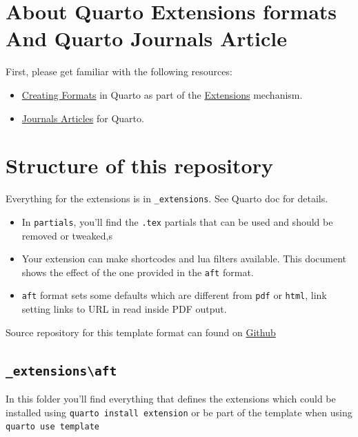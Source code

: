 \documentclass[
  10pt,
]{scrartcl}
\providecommand{\tightlist}{%
  \setlength{\itemsep}{0pt}\setlength{\parskip}{0pt}}\usepackage{longtable,booktabs,array}
\begin{document}
\section{About Quarto Extensions formats And Quarto Journals
Article}\label{about-quarto-extensions-formats-and-quarto-journals-article}

First, please get familiar with the following resources:

\begin{itemize}
\tightlist
\item
  \href{https://quarto.org/docs/extensions/formats.html}{Creating
  Formats} in Quarto as part of the
  \href{https://quarto.org/docs/extensions/}{Extensions} mechanism.
\item
  \href{https://quarto.org/docs/journals/}{Journals Articles} for
  Quarto.
\end{itemize}

\section{Structure of this
repository}\label{structure-of-this-repository}

Everything for the extensions is in \texttt{\_extensions}. See Quarto
doc for details.

\begin{itemize}
\item
  In \texttt{partials}, you'll find the \texttt{.tex} partials that can
  be used and should be removed or tweaked,s
\item
  Your extension can make shortcodes and lua filters available. This
  document shows the effect of the one provided in the \texttt{aft}
  format.
\item
  \texttt{aft} format sets some defaults which are different from
  \texttt{pdf} or \texttt{html}, link setting links to URL in read
  inside PDF output.
\end{itemize}

Source repository for this template format can found on
\href{https://github.com/quarto-journals/article-format-template}{Github}

\subsection{\texorpdfstring{\texttt{\_extensions\textbackslash{}aft}}{\_extensions\textbackslash aft}}\label{extensionsaft}

In this folder you'll find everything that defines the extensions which
could be installed using \texttt{quarto\ install\ extension} or be part
of the template when using \texttt{quarto\ use\ template}
\end{document}
